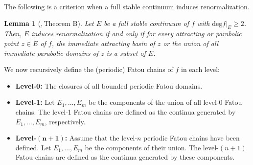 \documentclass[a4paper,reqno,times, 11pt]{amsart}
\newtheorem{lemma}[theorem]{Lemma}
\newtheorem{proposition}[theorem]{Proposition}
\theoremstyle{remark}
\theoremstyle{plain}
\numberwithin{equation}{section}
\begin{document}
	The following is  a criterion when a full stable continuum induces  renormalization.
	
	\begin{lemma}[\cite{BOPT},\,Theorem B]\label{lem:renormalization}
		Let $E$ be a full stable continuum of $f$ with  $\mathrm{deg} f|_E\geq 2$. Then, $E$ induces  renormalization if and only if for every attracting or parabolic point $z\in E$ of $f$, the immediate attracting
		basin of $z$ or the union of all immediate parabolic domains of $z$ is a subset of $E$.
	\end{lemma}
	
	
	
	We now recursively define the (periodic) Fatou chains of $f$ in each level:
	\begin{itemize}
		\item \textbf{Level-0:} The closures of all bounded periodic Fatou domains.
		
		\item \textbf{Level-1:} Let $E_1, \ldots, E_m$ be the components of the union of all  level-0 Fatou chains. The level-1  Fatou chains are  defined as the continua generated by $E_1, \ldots, E_m$, respectively.
		
		\item \textbf{Level-$\mathbf{(n+1)}$:} Assume that the level-$n$ periodic Fatou chains have been defined. Let $E_1, \ldots, E_m$ be the components of their union. The level-$(n+1)$  Fatou chains are defined as the continua generated by these components.
	\end{itemize}
	
	
	
\end{document}
